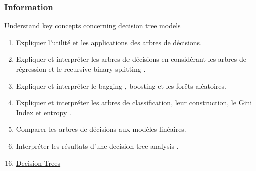 \documentclass[12pt, titlepage, french]{report}
\begin{document}
\subsubsection{Information}

\begin{distributions}[Objective]
Understand key concepts concerning decision tree models
\end{distributions}

\begin{outcomes}
\begin{enumerate}
	\item	Expliquer l'utilité et les applications des arbres de décisions.
	\item	Expliquer et interpréter les arbres de décisions en considérant les arbres de régression et le \og recursive binary splitting \fg{}.
	\item	Expliquer et interpréter le \og bagging \fg{}, \og boosting \fg{} et les forêts aléatoires.
	\item	Expliquer et interpréter les arbres de classification, leur construction, le \og Gini Index \fg{} et \og entropy \fg{}.
	\item	Comparer les arbres de décisions aux modèles linéaires.
	\item	Interpréter les résultats d'une \og decision tree analysis \fg{}.
\end{enumerate}
\end{outcomes}

\begin{ASM_chapter}
\begin{enumerate}
  \setcounter{enumi}{15}
	\item	\hyperref[DECISION-TREES]{Decision Trees}
\end{enumerate}
\end{ASM_chapter}
\end{document}
